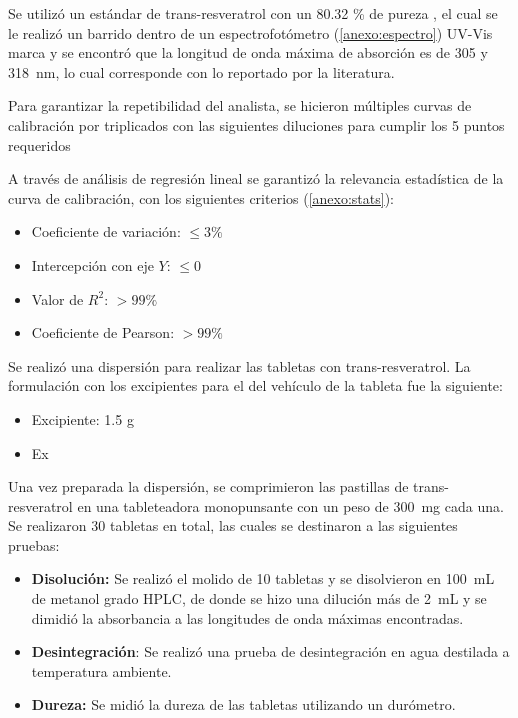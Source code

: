 Se utilizó un estándar de trans-resveratrol con un \num{80.32} \%
de pureza %
, el cual se le realizó un barrido dentro de un espectrofotómetro (\ref{anexo:espectro}) UV-Vis marca %
y se encontró que la longitud de onda máxima de absorción es de \num{305} y %
\SI{318}{\nano\meter}, lo cual corresponde con lo reportado por la literatura.

Para garantizar la repetibilidad del analista, se hicieron múltiples curvas de calibración por triplicados con las siguientes diluciones para cumplir 
los 5 puntos requeridos

A través de análisis de regresión lineal se garantizó la relevancia estadística de la curva de calibración, 
con los siguientes criterios (\ref{anexo:stats}):

\begin{multicols}{2}
    \begin{itemize}
        \item Coeficiente de variación: $\leq 3\%$
        \item Intercepción con eje $Y$: $\leq 0$
        \item Valor de $R^2$: $>99\%$
        \item Coeficiente de Pearson: $>99\%$
    \end{itemize}
\end{multicols}

Se realizó una dispersión para realizar las tabletas con trans-resveratrol. La formulación con los excipientes para el
del vehículo de la tableta fue la siguiente:

\begin{multicols}{2}
    \begin{itemize}
        \item Excipiente: 1.5 g
        \item Ex
    \end{itemize}
\end{multicols}

Una vez preparada la dispersión, se comprimieron las pastillas de trans-resveratrol
en una tableteadora monopunsante
con un peso de \SI{300}{\milli\gram} cada una. Se realizaron 30 tabletas en total,
las cuales se destinaron a las siguientes pruebas:

\begin{itemize}
    \item \textbf{Disolución:} Se realizó el molido de 10 tabletas  y se disolvieron en \SI{100}{\milli\liter} de metanol grado HPLC, 
    de donde se hizo una dilución más de \SI{2}{\milli\liter} y se dimidió la absorbancia a las longitudes de onda máximas encontradas.
    \item \textbf{Desintegración}: Se realizó una prueba de desintegración en agua destilada a temperatura ambiente.
    \item \textbf{Dureza:} Se midió la dureza de las tabletas utilizando un durómetro.
\end{itemize}